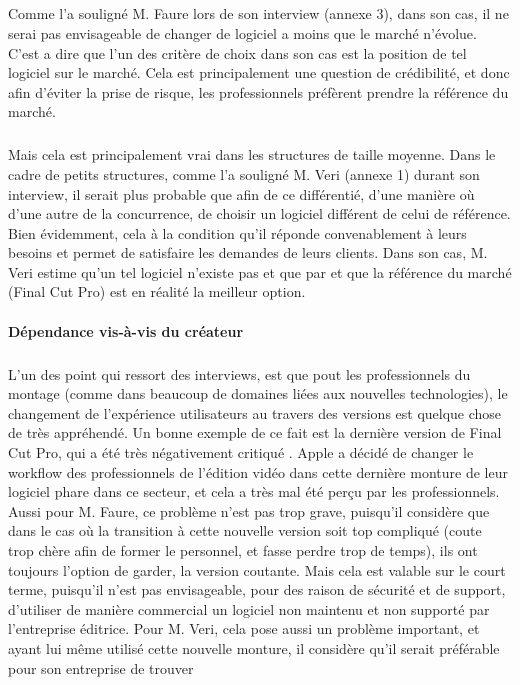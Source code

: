   \subparagraph{}
  Comme l'a souligné M. Faure lors de son interview (annexe 3), dans son cas, il ne serai pas envisageable de
  changer de logiciel a moins que le marché n'évolue. C'est a dire que l'un des critère de choix dans son cas
  est la position de tel logiciel sur le marché. Cela est principalement une question de crédibilité, et donc
  afin d'éviter la prise de risque, les professionnels préfèrent prendre la référence du marché.

  \subparagraph{}
  Mais cela est principalement vrai dans les structures de taille moyenne.
  Dans le cadre de petits structures, comme l'a souligné M. Veri (annexe 1) durant son interview,
  il serait plus probable que afin de ce différentié, d'une manière où d'une autre de la concurrence,
  de choisir un logiciel
  différent de celui de référence. Bien évidemment, cela à la condition qu'il réponde convenablement
  à leurs besoins et permet de satisfaire les demandes de leurs clients. Dans son cas, M. Veri estime
  qu'un tel logiciel n'existe pas et que par et que la référence du marché (Final Cut Pro) est en
  réalité la meilleur option.

  \paragraph{Dépendance vis-à-vis du créateur}
  \subparagraph{}
  L'un des point qui ressort des interviews, est que pout les professionnels du montage (comme dans
  beaucoup de domaines liées aux nouvelles technologies), le changement de l'expérience utilisateurs au
  travers des versions est quelque chose de très appréhendé. Un bonne exemple de ce fait est la dernière
  version de Final Cut Pro, qui a été très négativement critiqué \cite{FinalCutProXReviews}.
  Apple a décidé de changer le workflow  des professionnels de l'édition vidéo
  dans cette dernière monture de leur logiciel phare dans ce secteur, et cela a très mal été perçu par
  les professionnels. Aussi pour M. Faure, ce problème n'est pas trop grave, puisqu'il considère que
  dans le cas où la transition à cette nouvelle version soit top compliqué (coute trop chère afin de former
  le personnel, et fasse perdre trop de temps), ils ont toujours l'option de garder, la version coutante.
  Mais cela est valable sur le court terme, puisqu'il n'est pas envisageable, pour des raison de sécurité
  et de support, d'utiliser de manière commercial un logiciel non maintenu et non supporté par l'entreprise
  éditrice. Pour M. Veri, cela pose aussi un problème important, et ayant lui même utilisé cette nouvelle
  monture, il considère qu'il serait préférable pour son entreprise de trouver


